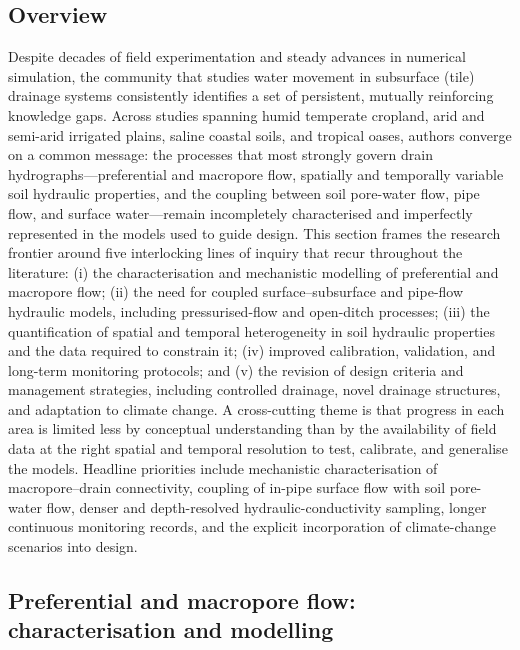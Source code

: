 \subsection{Overview}

Despite decades of field experimentation and steady advances in numerical
simulation, the community that studies water movement in subsurface (tile)
drainage systems consistently identifies a set of persistent, mutually
reinforcing knowledge gaps. Across studies spanning humid temperate cropland,
arid and semi-arid irrigated plains, saline coastal soils, and tropical
oases, authors converge on a common message: the processes that most strongly
govern drain hydrographs---preferential and macropore flow, spatially and
temporally variable soil hydraulic properties, and the coupling between soil
pore-water flow, pipe flow, and surface water---remain incompletely
characterised and imperfectly represented in the models used to guide design.
This section frames the research frontier around five interlocking lines of
inquiry that recur throughout the literature: (i) the characterisation and
mechanistic modelling of preferential and macropore flow; (ii) the need for
coupled surface--subsurface and pipe-flow hydraulic models, including
pressurised-flow and open-ditch processes; (iii) the quantification of
spatial and temporal heterogeneity in soil hydraulic properties and the data
required to constrain it; (iv) improved calibration, validation, and
long-term monitoring protocols; and (v) the revision of design criteria and
management strategies, including controlled drainage, novel drainage
structures, and adaptation to climate change. A cross-cutting theme is that
progress in each area is limited less by conceptual understanding than by the
availability of field data at the right spatial and temporal resolution to
test, calibrate, and generalise the models. Headline priorities include
mechanistic characterisation of macropore--drain connectivity, coupling of
in-pipe surface flow with soil pore-water flow, denser and depth-resolved
hydraulic-conductivity sampling, longer continuous monitoring records, and the
explicit incorporation of climate-change scenarios into design.

\subsection{Preferential and macropore flow: characterisation and modelling}

